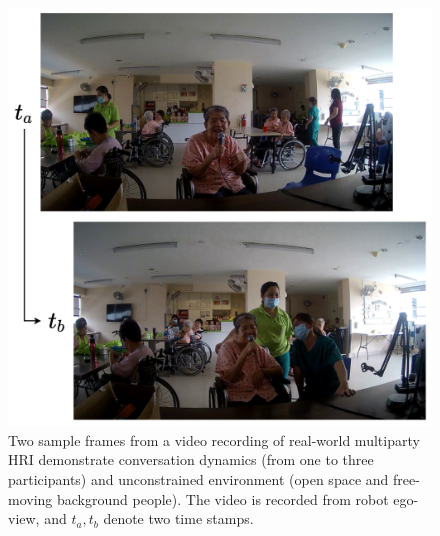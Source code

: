 \documentclass[twocolumn]{svjour3}
\begin{document}
\begin{figure}[t]
  \centering
  \includegraphics[width=\linewidth]{assets/interaction_sample.drawio.pdf}
  \caption{Two sample frames from a video recording of real-world multiparty HRI demonstrate conversation dynamics (from one to three participants) and unconstrained environment (open space and free-moving background people). The video is recorded from robot ego-view, and $t_a, t_b$ denote two time stamps.}
  \label{f:interaction_sample}
\end{figure}
\end{document}
